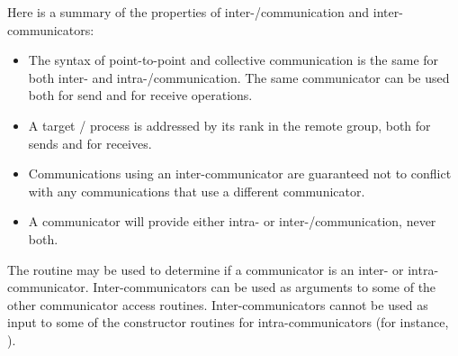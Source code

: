 Here is a summary of the properties of inter\hyphen/communication and
inter-communicators:
\begin{itemize} \item The syntax of point-to-point
and collective
communication is
the same for both inter- and intra\hyphen/communication. The same
communicator can be used both for send and for receive operations.

\item
A target \MPI/ process is addressed by its rank in the remote group, both for sends
and for receives.

\item
Communications using an inter-communicator are guaranteed not to
conflict with any communications that use a different communicator.

\item
A communicator will provide either intra- or
inter\hyphen/communication, never both.
\end{itemize}

\noindent The routine  may be used to determine if
a communicator is an inter- or intra-communicator. Inter-communicators can be
used as arguments to some of the other communicator access routines.
Inter-communicators cannot be used as input to some of the constructor routines
for intra-communicators (for instance, ).

